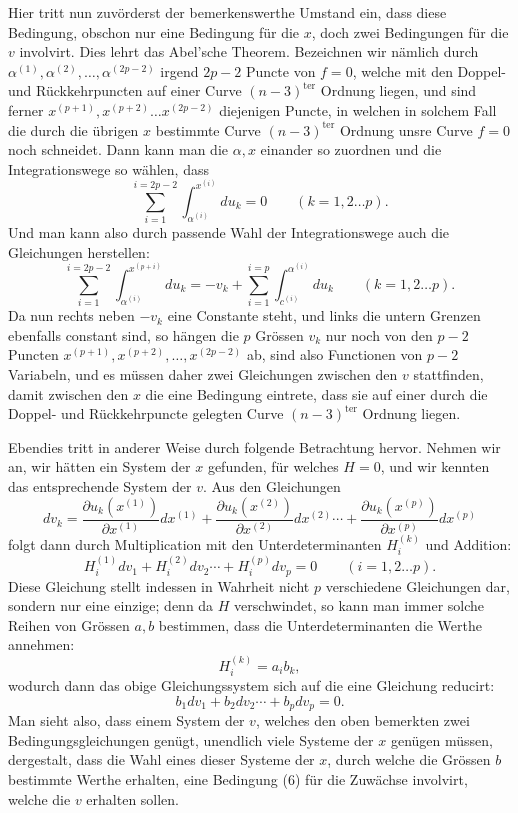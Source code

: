 \documentclass[10pt]{article}
\begin{document}
Hier tritt nun zuvörderst der bemerkenswerthe Umstand ein, dass diese Bedingung, obschon nur eine Bedingung für die \(x\), doch zwei Bedingungen für die \(v\) involvirt. Dies lehrt das Abel'sche Theorem. Bezeichnen wir nämlich durch \(\alpha^{(1)},\alpha^{(2)},\ldots,\alpha^{(2p-2)}\) irgend \(2p-2\) Puncte von \(f=0\), welche mit den Doppel- und Rückkehrpuncten auf einer Curve \((n-3)^{\mathrm{ter}}\) Ordnung liegen, und sind ferner \(x^{(p+1)},x^{(p+2)}\ldots x^{(2p-2)}\) diejenigen Puncte, in welchen in solchem Fall die durch die übrigen \(x\) bestimmte Curve \((n-3)^{\mathrm{ter}}\) Ordnung unsre Curve \(f=0\) noch schneidet. Dann kann man die \(\alpha,x\) einander so zuordnen und die Integrationswege so wählen, dass
\[
\sum_{i=1}^{i=2p-2}\int_{\alpha^{(i)}}^{x^{(i)}}du_k=0\qquad (k=1,2\ldots p).
\]
Und man kann also durch passende Wahl der Integrationswege auch die Gleichungen herstellen:
\[
\sum_{i=1}^{i=2p-2}\int_{\alpha^{(i)}}^{x^{(p+i)}}du_k=-v_k+\sum_{i=1}^{i=p}\int_{c^{(i)}}^{\alpha^{(i)}}du_k\qquad(k=1,2\ldots p).
\]
Da nun rechts neben \(-v_k\) eine Constante steht, und links die untern Grenzen ebenfalls constant sind, so hängen die \(p\) Grössen \(v_k\) nur noch von den \(p-2\) Puncten \(x^{(p+1)},x^{(p+2)},\ldots,x^{(2p-2)}\) ab, sind also Functionen von \(p-2\) Variabeln, und es müssen daher zwei Gleichungen zwischen den \(v\) stattfinden, damit zwischen den \(x\) die eine Bedingung eintrete, dass sie auf einer durch die Doppel- und Rückkehrpuncte gelegten Curve \((n-3)^{\mathrm{ter}}\) Ordnung liegen.

Ebendies tritt in anderer Weise durch folgende Betrachtung hervor. Nehmen wir an, wir hätten ein System der \(x\) gefunden, für welches \(H=0\), und wir kennten das entsprechende System der \(v\). Aus den Gleichungen
\[
dv_k=\frac{\partial u_k(x^{(1)})}{\partial x^{(1)}}dx^{(1)}+\frac{\partial u_k(x^{(2)})}{\partial x^{(2)}}dx^{(2)}\cdots+\frac{\partial u_k(x^{(p)})}{\partial x^{(p)}}dx^{(p)}
\]
folgt dann durch Multiplication mit den Unterdeterminanten \(H_i^{(k)}\) und Addition:
\[
H_i^{(1)}dv_1+H_i^{(2)}dv_2\cdots+H_i^{(p)}dv_p=0\qquad(i=1,2\ldots p).
\]
Diese Gleichung stellt indessen in Wahrheit nicht \(p\) verschiedene Gleichungen dar, sondern nur eine einzige; denn da \(H\) verschwindet, so kann man immer solche Reihen von Grössen \(a,b\) bestimmen, dass die Unterdeterminanten die Werthe annehmen:
\[
H_i^{(k)}=a_i b_k,
\]
wodurch dann das obige Gleichungssystem sich auf die eine Gleichung reducirt:
\[
\tag{6} b_1dv_1+b_2dv_2\cdots+b_pdv_p=0.
\]
Man sieht also, dass einem System der \(v\), welches den oben bemerkten zwei Bedingungsgleichungen genügt, unendlich viele Systeme der \(x\) genügen müssen, dergestalt, dass die Wahl eines dieser Systeme der \(x\), durch welche die Grössen \(b\) bestimmte Werthe erhalten, eine Bedingung (6) für die Zuwächse involvirt, welche die \(v\) erhalten sollen.
\end{document}
